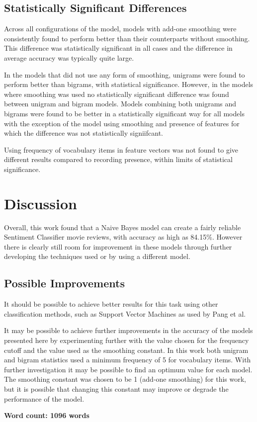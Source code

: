 \documentclass[twocolumn]{article}
\begin{document}
\subsection{Statistically Significant Differences}

Across all configurations of the model, models with add-one smoothing were consistently found to perform better than their counterparts without smoothing. This difference was statistically significant in all cases and the difference in average accuracy was typically quite large.

In the models that did not use any form of smoothing, unigrams were found to perform better than bigrams, with statistical significance. However, in the models where smoothing was used no statistically significant difference was found between unigram and bigram models. Models combining both unigrams and bigrams were found to be better in a statistically significant way for all models with the exception of the model using smoothing and presence of features for which the difference was not statistically signiifcant.

Using frequency of vocabulary items in feature vectors was not found to give different results compared to recording presence, within limits of statistical significance.

\section{Discussion}

Overall, this work found that a Naive Bayes model can create a fairly reliable Sentiment Classifier movie reviews, with accuracy as high as 84.15\%. However there is clearly still room for improvement in these models through further developing the techniques used or by using a different model.

\subsection{Possible Improvements}

It should be possible to achieve better results for this task using other classification methods, such as Support Vector Machines as used by Pang et al. 

It may be possible to achieve further improvements in the accuracy of the models presented here by experimenting further with the value chosen for the frequency cutoff and the value used as the smoothing constant. In this work both unigram and bigram statistics used a minimum frequency of 5 for vocabulary items. With further investigation it may be possible to find an optimum value for each model. The smoothing constant was chosen to be 1 (add-one smoothing) for this work, but it is possible that changing this constant may improve or degrade the performance of the model.





\textbf{Word count: 1096 words}

{}

\end{document}
